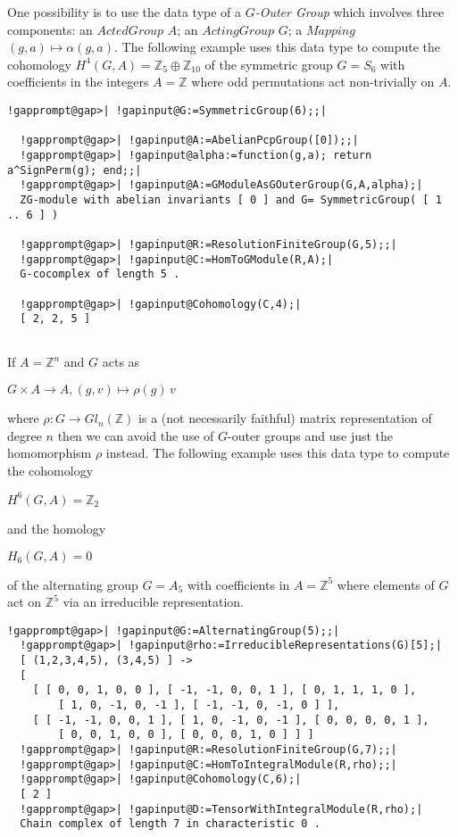 \documentclass[a4paper,11pt]{report}
\begin{document}
{{One possibility is to use the data type of a \emph{$G$-Outer Group} which involves three components: an $ActedGroup$ $A$; an $Acting Group$ $G$; a $Mapping$ $(g,a)\mapsto \alpha(g,a)$. The following example uses this data type to compute the cohomology $H^4(G,A) =\mathbb Z_5 \oplus \mathbb Z_{10}$ of the symmetric group $G=S_6$ with coefficients in the integers $A=\mathbb Z$ where odd permutations act non-trivially on $A$. 
\begin{Verbatim}[commandchars=!@|,fontsize=\small,frame=single,label=Example]
  !gapprompt@gap>| !gapinput@G:=SymmetricGroup(6);;|
  
  !gapprompt@gap>| !gapinput@A:=AbelianPcpGroup([0]);;|
  !gapprompt@gap>| !gapinput@alpha:=function(g,a); return a^SignPerm(g); end;;|
  !gapprompt@gap>| !gapinput@A:=GModuleAsGOuterGroup(G,A,alpha);|
  ZG-module with abelian invariants [ 0 ] and G= SymmetricGroup( [ 1 .. 6 ] )
  
  !gapprompt@gap>| !gapinput@R:=ResolutionFiniteGroup(G,5);;|
  !gapprompt@gap>| !gapinput@C:=HomToGModule(R,A);|
  G-cocomplex of length 5 . 
  
  !gapprompt@gap>| !gapinput@Cohomology(C,4);|
  [ 2, 2, 5 ]
  
\end{Verbatim}
 

 If $A=\mathbb Z^n$ and $G$ acts as 

$G\times A \rightarrow A, (g, v) \mapsto \rho(g)\, v $ 

 where $\rho\colon G\rightarrow Gl_n(\mathbb Z)$ is a (not necessarily faithful) matrix representation of degree $n$ then we can avoid the use of $G$-outer groups and use just the homomorphism $\rho$ instead. The following example uses this data type to compute the cohomology 

$H^6(G,A) =\mathbb Z_2 $ 

and the homology 

$H_6(G,A) = 0 $ 

 of the alternating group $G=A_5$ with coefficients in $A=\mathbb Z^5$ where elements of $G$ act on $\mathbb Z^5$ via an irreducible representation. 
\begin{Verbatim}[commandchars=!@|,fontsize=\small,frame=single,label=Example]
  !gapprompt@gap>| !gapinput@G:=AlternatingGroup(5);;|
  !gapprompt@gap>| !gapinput@rho:=IrreducibleRepresentations(G)[5];|
  [ (1,2,3,4,5), (3,4,5) ] -> 
  [ 
    [ [ 0, 0, 1, 0, 0 ], [ -1, -1, 0, 0, 1 ], [ 0, 1, 1, 1, 0 ], 
        [ 1, 0, -1, 0, -1 ], [ -1, -1, 0, -1, 0 ] ], 
    [ [ -1, -1, 0, 0, 1 ], [ 1, 0, -1, 0, -1 ], [ 0, 0, 0, 0, 1 ], 
        [ 0, 0, 1, 0, 0 ], [ 0, 0, 0, 1, 0 ] ] ]
  !gapprompt@gap>| !gapinput@R:=ResolutionFiniteGroup(G,7);;|
  !gapprompt@gap>| !gapinput@C:=HomToIntegralModule(R,rho);;|
  !gapprompt@gap>| !gapinput@Cohomology(C,6);|
  [ 2 ]
  !gapprompt@gap>| !gapinput@D:=TensorWithIntegralModule(R,rho);|
  Chain complex of length 7 in characteristic 0 . 
  

\end{Verbatim}}}
\end{document}
